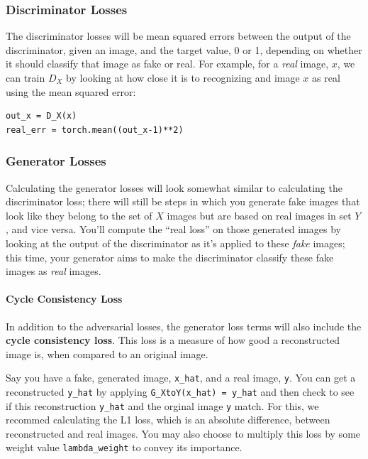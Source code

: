 \subsubsection{Discriminator Losses}
The discriminator losses will be mean squared errors between the output
of the discriminator, given an image, and the target value, 0 or 1,
depending on whether it should classify that image as fake or real. For
example, for a \emph{real} image, \(x\), we can
train \(D_X\) by looking at how close it is to recognizing and image
\(x\) as real using the mean squared error:
\begin{lstlisting}
out_x = D_X(x)
real_err = torch.mean((out_x-1)**2)
\end{lstlisting}
\subsubsection{Generator Losses}
Calculating the generator losses will look somewhat similar to
calculating the discriminator loss; there will still be steps in which
you generate fake images that look like they belong to the set of \(X\)
images but are based on real images in set \(Y\), and vice versa. You'll
compute the ``real loss'' on those generated images by looking at the
output of the discriminator as it's applied to these \emph{fake} images;
this time, your generator aims to make the discriminator classify these
fake images as \emph{real} images.

\paragraph{Cycle Consistency Loss}

In addition to the adversarial losses, the generator loss terms will
also include the \textbf{cycle consistency loss}. This loss is a measure
of how good a reconstructed image is, when compared to an original
image. \newline

Say you have a fake, generated image, \lstinline{x_hat},
and a real image, \lstinline{y}. You can get a
reconstructed \lstinline{y_hat} by applying
\lstinline{G_XtoY(x_hat) = y_hat} and then check to see
if this reconstruction \lstinline{y_hat} and the orginal
image \lstinline{y} match. For this, we recommed
calculating the L1 loss, which is an absolute difference, between
reconstructed and real images. You may also choose to multiply this loss
by some weight value \lstinline{lambda_weight} to convey
its importance.

